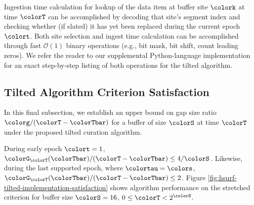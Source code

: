 Ingestion time calculation for lookup of the data item at buffer site $\colork$ at time $\colorT$ can be accomplished by decoding that site's segment index and checking whether (if slated) it has yet been replaced during the current epoch $\colort$.
Both site selection and ingest time calculation can be accomplished through fast $\mathcal{O}(1)$ binary operations (e.g., bit mask, bit shift, count leading zeros).
We refer the reader to our supplemental Python-language implementation for an exact step-by-step listing of both operations for the tilted algorithm.

\subsection{Tilted Algorithm Criterion Satisfaction}
\label{sec:tilted-satisfaction}

In this final subsection, we establish an upper bound on gap size ratio $\colorg/(\colorT - \colorTbar)$ for a buffer of size $\colorS$ at time $\colorT$ under the proposed tilted curation algorithm.



During early epoch $\colort = 1$, $\colorG_{\colorT}(\colorTbar)/(\colorT - \colorTbar) \leq 4/\colorS$.
Likewise, during the last supported epoch, where $\colortau = \colors$, $\colorG_{\colorT}(\colorTbar)/(\colorT - \colorTbar) \leq 2$.
Figure \ref{fig:hsurf-tilted-implementation-satisfaction} shows algorithm performance on the stretched criterion for buffer size $\colorS=16$, $0 \leq \colorT < 2^{\colorS}$.
